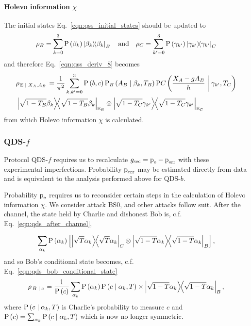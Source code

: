 \paragraph{Holevo information $\chi$}
The initial states Eq.~\ref{eqn:qss_initial_states} should be updated to
\begin{equation}
\rho_B = \sum_{k=0}^3 \text{P}\left(\beta_k\right) \dyad{\beta_k}_B \qq{and} \rho_C = \sum_{k^\prime=0}^3 \text{P}\left(\gamma_{k^\prime}\right) \dyad{\gamma_{k^\prime}}_C
\end{equation}
and therefore Eq.~\ref{eqn:qss_deriv_8} becomes
\begin{align}
&\rho_{\left.\mathbb{E} \given X_A, A_B\right.} = \frac{1}{\pi^2}\sum_{k, k^\prime=0}^3 \text{P}\left(b, c\right) \text{P}_B\left(A_B \given \beta_k, T_B\right) \text{P}C\left(\frac{X_A - g A_B}{h} \given \gamma_{k^\prime}, T_C\right) \notag \\
&\dyad{\sqrt{1-T_B}\beta_k}_{\mathbb{E}_B} \otimes \dyad{\sqrt{1-T_C} \gamma_{k^\prime}}_{\mathbb{E}_C}
\end{align}
from which Holevo information $\chi$ is calculated.

\subsubsection{QDS-$f$}
Protocol QDS-$f$ requires us to recalculate $g_{\text{sec}} = \text{p}_{\text{e}} - \text{p}_{\text{err}}$ with these experimental imperfections. Probability $\text{p}_{\text{err}}$ may be estimated directly from data and is equivalent to the analysis performed above for QDS-$b$.

Probability $\text{p}_{\text{e}}$ requires us to reconsider certain steps in the calculation of Holevo information $\chi$. We consider attack BS$0$, and other attacks follow suit. After the channel, the state held by Charlie and dishonest Bob is, c.f. Eq.~\ref{eqn:qds_after_channel},

\begin{equation}
\sum_{\alpha_k} \text{P}\left(\alpha_k\right)  \left[ \dyad{\sqrt{T}\alpha_k}_C \otimes \dyad{\sqrt{1-T}\alpha_k}_B\right],
\end{equation}
and so Bob's conditional state becomes, c.f. Eq.~\ref{eqn:qds_bob_conditional_state}
\begin{equation}
\rho_{\left.B \given c\right.} = \frac{1}{\text{P}\left(c\right)} \sum_{\alpha_k} \text{P}\left(\alpha_k\right) \text{P}\left(c \given \alpha_k, T\right) \times \dyad{\sqrt{1-T}\alpha_k}_B,
\end{equation}
where $\text{P}\left(c \; \middle| \; \alpha_k, T\right)$ is Charlie's probability to measure $c$ and $\text{P}\left(c\right) = \sum_{\alpha_k}\text{P}\left(c \; \middle| \; \alpha_k, T\right)$ which is now no longer symmetric.

